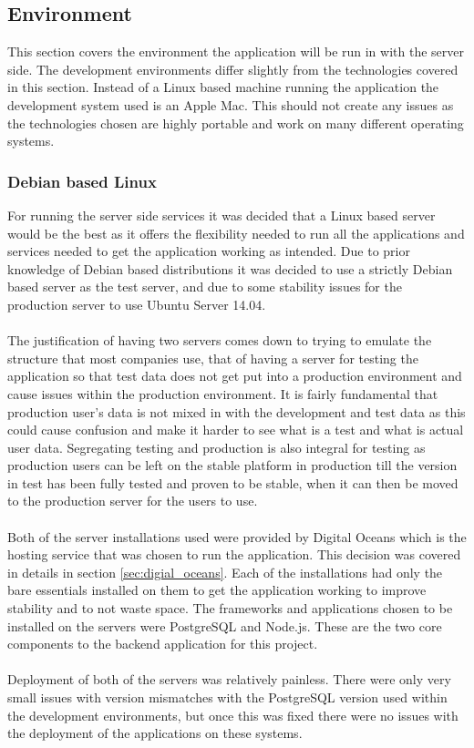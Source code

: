 \subsection{Environment}

This section covers the environment the application will be run in with the server side. The development environments differ slightly from the technologies covered in this section. Instead of a Linux based machine running the application the development system used is an Apple Mac. This should not create any issues as the technologies chosen are highly portable and work on many different operating systems.

\subsubsection{Debian based Linux}
\label{sec:debian_server}

For running the server side services it was decided that a Linux based server would be the best as it offers the flexibility needed to run all the applications and services needed to get the application working as intended. Due to prior knowledge of Debian based distributions it was decided to use a strictly Debian based server as the test server, and due to some stability issues for the production server to use Ubuntu Server 14.04.\\
\\
The justification of having two servers comes down to trying to emulate the structure that most companies use, that of having a server for testing the application so that test data does not get put into a production environment and cause issues within the production environment. It is fairly fundamental that production user's data is not mixed in with the development and test data as this could cause confusion and make it harder to see what is a test and what is actual user data. Segregating testing and production is also integral for testing as production users can be left on the stable platform in production till the version in test has been fully tested and proven to be stable, when it can then be moved to the production server for the users to use.\\
\\
Both of the server installations used were provided by Digital Oceans which is the hosting service that was chosen to run the application. This decision was covered in details in section \ref{sec:digial_oceans}. Each of the installations had only the bare essentials installed on them to get the application working to improve stability and to not waste space. The frameworks and applications chosen to be installed on the servers were PostgreSQL and Node.js. These are the two core components to the backend application for this project.\\
\\
Deployment of both of the servers was relatively painless. There were only very small issues with version mismatches with the PostgreSQL version used within the development environments, but once this was fixed there were no issues with the deployment of the applications on these systems.

